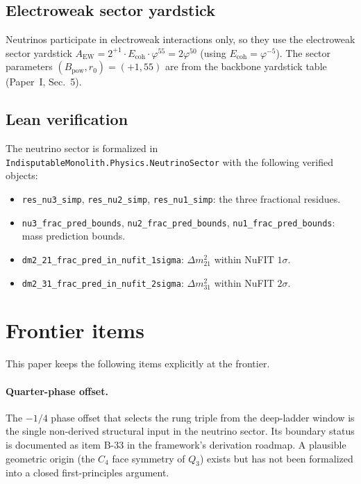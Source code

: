 \documentclass[11pt]{article}
\theoremstyle{remark}
\newcommand{\phig}{\varphi}
\newcommand{\Ecoh}{E_{\mathrm{coh}}}
\newcommand{\Bpow}{B_{\mathrm{pow}}}
\begin{document}
\subsection{Electroweak sector yardstick}

Neutrinos participate in electroweak interactions only, so
they use the electroweak sector yardstick
$A_{\mathrm{EW}} = 2^{+1}\cdot\Ecoh\cdot\phig^{55}
= 2\phig^{50}$ (using $\Ecoh=\phig^{-5}$).
The sector parameters $(\Bpow,r_0)=(+1,55)$ are from the
backbone yardstick table (Paper~I, Sec.~5).

\subsection{Lean verification}

The neutrino sector is formalized in
\texttt{IndisputableMonolith.Physics.NeutrinoSector} with the
following verified objects:
\begin{itemize}[nosep]
  \item \texttt{res\_nu3\_simp}, \texttt{res\_nu2\_simp},
    \texttt{res\_nu1\_simp}: the three fractional residues.
  \item \texttt{nu3\_frac\_pred\_bounds},
    \texttt{nu2\_frac\_pred\_bounds},
    \texttt{nu1\_frac\_pred\_bounds}: mass prediction bounds.
  \item \texttt{dm2\_21\_frac\_pred\_in\_nufit\_1sigma}:
    $\Delta m^2_{21}$ within NuFIT $1\sigma$.
  \item \texttt{dm2\_31\_frac\_pred\_in\_nufit\_2sigma}:
    $\Delta m^2_{31}$ within NuFIT $2\sigma$.
\end{itemize}

\section{Frontier items}
\label{sec:frontier}

This paper keeps the following items explicitly at the frontier.

\paragraph{Quarter-phase offset.}
The $-1/4$ phase offset that selects the rung triple from the
deep-ladder window is the single non-derived structural input
in the neutrino sector.  Its boundary status is documented as
item B-33 in the framework's derivation roadmap.  A plausible
geometric origin (the $C_4$ face symmetry of $Q_3$) exists but
has not been formalized into a closed first-principles argument.
\end{document}
